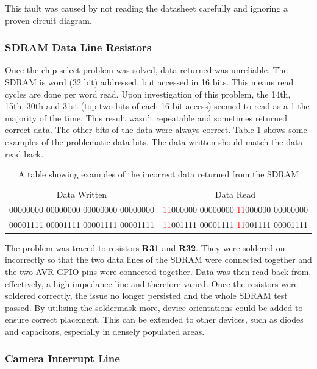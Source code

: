 This fault was caused by not reading the datasheet carefully and ignoring a proven circuit diagram. 

\subsubsection{SDRAM Data Line Resistors}
Once the chip select problem was solved, data returned was unreliable. The SDRAM is word (32 bit) addressed, but accessed in 16 bits. This means read cycles are done per word read. 
Upon investigation of this problem, the 14th, 15th, 30th and 31st (top two bits of each 16 bit access) seemed to read as a 1 the majority of the time. This result wasn't repeatable and sometimes returned correct data. The other bits of the data were always correct. Table \ref{table:SDRAM_Err} shows some examples of the problematic data bits. The data written should match the data read back. 

\begin{table}[!ht]
\caption{A table showing examples of the incorrect data returned from the SDRAM}
\label{table:SDRAM_Err}
\begin{tabular}{c c}
Data Written							&	Data Read \\
00000000 00000000 00000000 00000000		&	\textcolor{red}{11}000000 00000000 \textcolor{red}{11}000000 00000000 \\
00001111 00001111 00001111 00001111		&	\textcolor{red}{11}001111 00001111 \textcolor{red}{11}001111 00001111 \\
\end{tabular}
\end{table}

The problem was traced to resistors \textbf{R31} and \textbf{R32}. They were soldered on incorrectly so that the two data lines of the SDRAM were connected together and the two AVR GPIO pins were connected together. Data was then read back from, effectively, a high impedance line and therefore varied. Once the resistors were soldered correctly, the issue no longer persisted and the whole SDRAM test passed. By utilising the soldermask more, device orientations could be added to ensure correct placement. This can be extended to other devices, such as diodes and capacitors, especially in densely populated areas. 

\subsubsection{Camera Interrupt Line}

